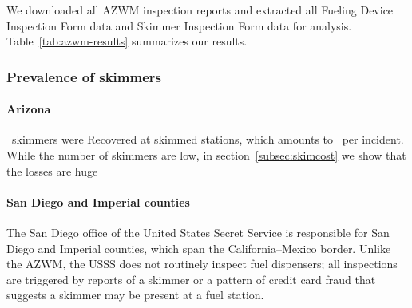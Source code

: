 We downloaded all AZWM inspection reports and extracted all Fueling Device Inspection Form data and Skimmer Inspection Form data for analysis. Table~\ref{tab:azwm-results} summarizes our results.

\subsubsection{Prevalence of skimmers} %

\paragraph{Arizona}  \azALLskimmers~skimmers were
Recovered at skimmed stations, which amounts to \azALLskperinc~per incident.
While the number of skimmers are low, in section~\ref{subsec:skimcost} we show that the losses are huge

\paragraph{San Diego and Imperial counties} The San Diego office of the United States Secret Service is responsible
for San Diego and Imperial counties, which span the California--Mexico border. Unlike the AZWM, the USSS does not
routinely inspect fuel dispensers; all inspections are triggered by reports of a skimmer or a pattern of credit card
fraud that suggests a skimmer may be present at a fuel station.

%    

